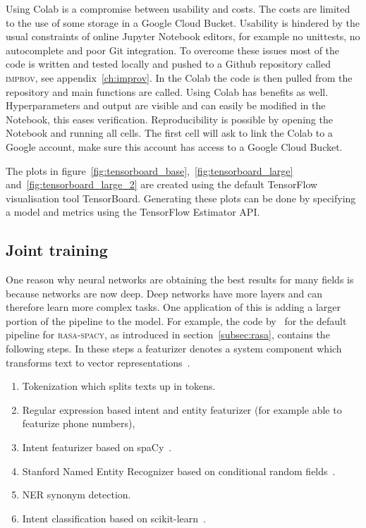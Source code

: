 Using Colab is a compromise between usability and costs.
The costs are limited to the use of some storage in a Google Cloud Bucket.
Usability is hindered by the usual constraints of online Jupyter Notebook editors, for example no unittests, no autocomplete and poor Git integration.
To overcome these issues most of the code is written and tested locally and pushed to a Github repository called \textsc{improv}, see appendix~\ref{ch:improv}.
In the Colab the code is then pulled from the repository and main functions are called.
Using Colab has benefits as well.
Hyperparameters and output are visible and can easily be modified in the Notebook, this eases verification.
Reproducibility is possible by opening the Notebook and running all cells.
The first cell will ask to link the Colab to a Google account, make sure this account has access to a Google Cloud Bucket.

The plots in figure~\ref{fig:tensorboard_base},~\ref{fig:tensorboard_large} and~\ref{fig:tensorboard_large_2} are created using the default TensorFlow visualisation tool TensorBoard.
Generating these plots can be done by specifying a model and metrics using the TensorFlow Estimator API.


\subsection{Joint training}
\label{subsec:joint_training}
One reason why neural networks are obtaining the best results for many fields is because networks are now deep.
Deep networks have more layers and can therefore learn more complex tasks.
One application of this is adding a larger portion of the pipeline to the model.
For example, the code by~\citet{rasa2018config} for the default pipeline for \textsc{rasa-spacy}, as introduced in section~\ref{subsec:rasa}, contains the following steps.
In these steps a featurizer denotes a system component which transforms text to vector representations~\citep{brutlag2000challenges}.
\begin{enumerate}
    \item Tokenization which splits texts up in tokens.
    \item Regular expression based intent and entity featurizer (for example able to featurize phone numbers),
    \item Intent featurizer based on spaCy~\citep{spacy2019}.
    \item Stanford Named Entity Recognizer based on conditional random fields~\citep{finkel2005incorporating}.
    \item NER synonym detection.
    \item Intent classification based on scikit-learn~\citep{scikit2019}.
\end{enumerate}

